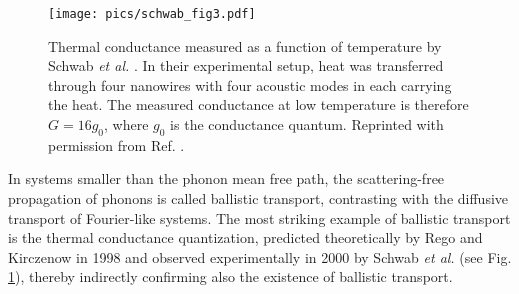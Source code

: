 
\begin{figure}
\begin{center}
 \texttt{[image: pics/schwab\_fig3.pdf]}
 \caption{Thermal conductance measured as a function of temperature by Schwab \textit{et al.} \cite{schwab00}. In their experimental setup, heat was transferred through four nanowires with four acoustic modes in each carrying the heat. The measured conductance at low temperature is therefore $G=16g_0$, where $g_0$ is the conductance quantum. Reprinted with permission from Ref. \cite{schwab00}.}
\label{fig:intro_schwab}
\end{center}
\end{figure}

In systems smaller than the phonon mean free path, the scattering-free propagation of phonons is called ballistic transport, contrasting with the diffusive transport of Fourier-like systems. The most striking example of ballistic transport is the thermal conductance quantization, predicted theoretically by Rego and Kirczenow in 1998 \cite{rego98} and observed experimentally in 2000 by Schwab \textit{et al.} \cite{schwab00} (see Fig. \ref{fig:intro_schwab}), thereby indirectly confirming also the existence of ballistic transport. 



